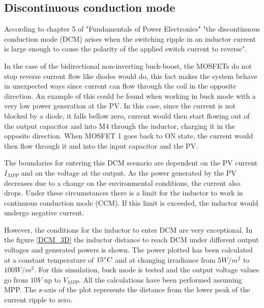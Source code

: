 \subsection{Discontinuous conduction mode}
\label{DCM_Discussion}


According to chapter 5 of "Fundamentals of Power Electronics" \cite{Erickson} "the discontinuous conduction mode (DCM) arises when the switching ripple in an inductor current is large enough to cause the polarity of the applied switch current to reverse". 

In the case of the bidirectional non-inverting buck-boost, the MOSFETs do not stop reverse current flow like diodes would do, this fact makes the system behave in unexpected ways since current can flow through the coil in the opposite direction. An example of this could be found when working in buck mode with a very low power generation at the PV. In this case, since the current is not blocked by a diode, it falls bellow zero, current would then start flowing out of the output capacitor and into M4 through the inductor, charging it in the opposite direction. When MOSFET 1 goes back to ON state, the current would then flow through it and into the input capacitor and the PV. 

The boundaries for entering this DCM scenario are dependent on the PV current $I_{MPP}$ and on the voltage at the output. As the power generated by the PV decreases due to a change on the environmental conditions, the current also drops. Under these circumstances there is a limit for the inductor to work in continuous conduction mode (CCM). If this limit is exceeded, the inductor would undergo negative current.

However, the conditions for the inductor to enter DCM are very exceptional. In the figure \ref{DCM_3D} the inductor distance to reach DCM under different output voltages and generated powers is shown. The power plotted has been calculated at a constant temperature of $15\dec C$ and at changing irradiance from $5W/m^2$ to $100W/m^2$. For this simulation, buck mode is tested and the output voltage values go from $10V$ up to $V_{MPP}$. All the calculations have been performed assuming MPP.
The z-axis of the plot represents the distance from the lower peak of the current ripple to zero.



